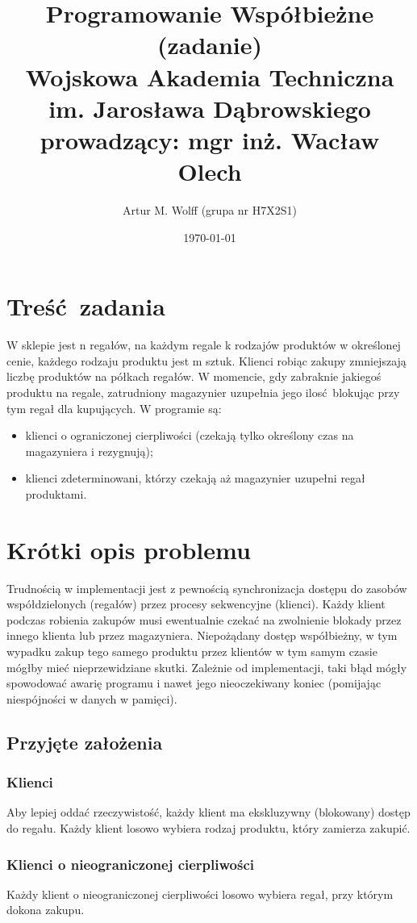 \documentclass[titlepage]{article}
\title{
	\Large{Programowanie Współbieżne (zadanie)}
	\\
	\normalsize{Wojskowa Akademia Techniczna im. Jarosława Dąbrowskiego}
	\\
	\normalsize{prowadzący: mgr inż. Wacław Olech}
	}
\author{Artur M. Wolff (grupa nr H7X2S1)}
\date{\today}
\begin{document}
\maketitle

\section{Treść zadania}
W sklepie jest n regałów, na każdym regale k rodzajów produktów w określonej cenie, każdego rodzaju produktu jest m sztuk.
Klienci robiąc zakupy zmniejszają liczbę produktów na półkach regałów.
W momencie, gdy zabraknie jakiegoś produktu na regale, zatrudniony magazynier uzupełnia jego ilosć blokując przy tym regał dla kupujących.
W programie są:
\begin{itemize}
	\item klienci o ograniczonej cierpliwości (czekają tylko określony czas na magazyniera i rezygnują);
	\item klienci zdeterminowani, którzy czekają aż magazynier uzupełni regał produktami.
\end{itemize}

\section{Krótki opis problemu}
Trudnością w implementacji jest z pewnością synchronizacja dostępu do zasobów współdzielonych (regałów) przez procesy sekwencyjne (klienci).
Każdy klient podczas robienia zakupów musi ewentualnie czekać na zwolnienie blokady przez innego klienta lub przez magazyniera.
Niepożądany dostęp współbieżny, w tym wypadku zakup tego samego produktu przez klientów w tym samym czasie mógłby mieć nieprzewidziane skutki.
Zależnie od implementacji, taki błąd mógły spowodować awarię programu i nawet jego nieoczekiwany koniec (pomijając niespójności w danych w pamięci).

\subsection{Przyjęte założenia}

\subsubsection{Klienci}
Aby lepiej oddać rzeczywistość, każdy klient ma ekskluzywny (blokowany) dostęp do regału.
Każdy klient losowo wybiera rodzaj produktu, który zamierza zakupić.

\subsubsection{Klienci o nieograniczonej cierpliwości}
Każdy klient o nieograniczonej cierpliwości losowo wybiera regał, przy którym dokona zakupu.
\end{document}
